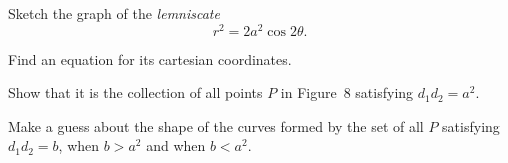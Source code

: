 \begin{letters}
\item Sketch the graph of the \emph{lemniscate}
  \[
  r^2=2a^2\cos 2\theta.
  \]
\item Find an equation for its cartesian coordinates.
\item Show that it is the collection of all points $P$ in Figure~8 satisfying
  $d_1d_2=a^2$.
\item Make a guess about the shape of the curves formed by the set of all $P$
  satisfying $d_1d_2=b$, when $b>a^2$ and when $b<a^2$.
\end{letters}

\begin{center}
\\[0.6em]
\end{center}

